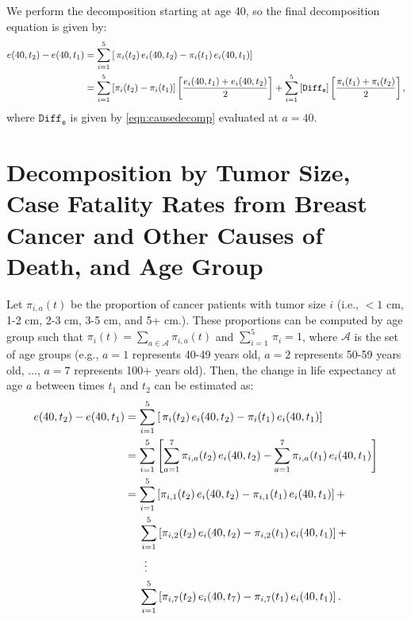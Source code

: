 \documentclass[11pt,letterpaper]{article}
\theoremstyle{plain}
\theoremstyle{remark}
\numberwithin{equation}{section}
\begin{document}
We perform the decomposition starting at age 40, so the final
decomposition equation is given by:
\begin{align*}
  e(40,t_2)-e(40,t_1)&=\sum_{i=1}^{5}\left[\,\pi_i(t_2)\,e_i(40,t_2)- \pi_i(t_1)\,e_i(40,t_1)\right] \notag \\
                     &=\sum_{i=1}^{5}\left[\pi_i(t_2)-\pi_i(t_1) \right]\left[\frac{e_i(40,t_1)+e_i(40,t_2)}{2}\right]+\sum_{i=1}^{5}\left[\mathtt{Diff_e} \right]\left[\frac{\pi_i(t_1)+\pi_i(t_2)}{2}\right],
\end{align*}
where $\mathtt{Diff_e}$ is given by \eqref{eqn:causedecomp} evaluated at $a=40$.\\


\section{Decomposition by Tumor Size, Case Fatality Rates from
  Breast Cancer and Other Causes of Death, and Age Group}
Let $\pi_{i,a}(t)$ be the proportion of cancer patients with tumor
size $i$ (i.e., $<1$ cm, 1-2 cm, 2-3 cm, 3-5 cm, and 5+ cm.). These
proportions can be computed by age group such that
$\pi_i(t)=\sum_{a\in\mathcal{A}}\pi_{i,a}(t)$ and
$\sum_{i=1}^{5}\,\pi_i=1$, where $\mathcal{A}$ is the set of age
groups (e.g., $a=1$ represents 40-49 years old, $a=2$ represents 50-59
years old, $\dots$, $a=7$ represents 100+ years old).  Then, the
change in life expectancy at age $a$ between times $t_1$ and $t_2$ can
be estimated as:
\begin{align*}
  e(40,t_2)-e(40,t_1)&=\sum_{i=1}^{5}\left[\,\pi_i(t_2)\,e_i(40,t_2)- \pi_i(t_1)\,e_i(40,t_1)\right] \\
                     &=\sum_{i=1}^{5} \left[\sum_{a=1}^{7}\pi_{i,a}(t_2)\,e_i(40,t_2)- \sum_{a=1}^{7}\pi_{i,a}(t_1)\,e_i(40,t_1) \right]\\
                     &=\sum_{i=1}^{5}\left[\pi_{i,1}(t_2)\,e_i(40,t_2)-
                       \pi_{i,1}(t_1)\,e_i(40,t_1)\right] +\\
                     &\hspace{0.18in}\sum_{i=1}^{5}\left[\pi_{i,2}(t_2)\,e_i(40,t_2)- \pi_{i,2}(t_1)\,e_i(40,t_1)\right] + \\
  &\phantom{=\Sigma}\vdots \\
                     &\hspace{0.18in}\sum_{i=1}^{5}\left[\pi_{i,7}(t_2)\,e_i(40,t_7)- \pi_{i,7}(t_1)\,e_i(40,t_1)\right]. \notag 
 \end{align*}
\end{document}
